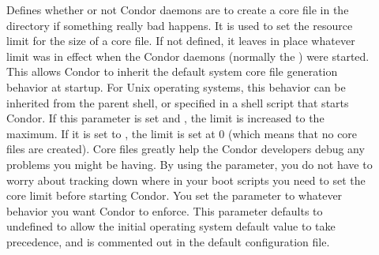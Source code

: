 \begin{description}
\item[] \label{param:CreateCoreFiles}
  Defines whether or not Condor daemons are to
  create a core file in the  directory
  if something really bad happens.  It is
  used to set
  the resource limit for the size of a core file.  If not defined,
  it leaves in place whatever limit was in effect
  when the Condor daemons (normally the ) were started.
  This allows Condor to inherit the default system core file generation
  behavior at startup.  For Unix operating systems, this behavior can
  be inherited from the parent shell, or specified in a shell script
  that starts Condor.
  If this parameter is set and , the limit is increased to
  the maximum.  If it is set to , the limit is set at 0
  (which means that no core files are created).  Core files
  greatly help the Condor developers debug any problems you might be
  having.  By using the parameter, you do not have to worry about
  tracking down where in your boot scripts you need to set the core
  limit before starting Condor. You set the parameter
  to whatever behavior you want Condor to enforce.  This parameter
  defaults to undefined to allow the initial operating system default
  value to take precedence, 
  and is commented out in the default configuration file. 


\end{description}

